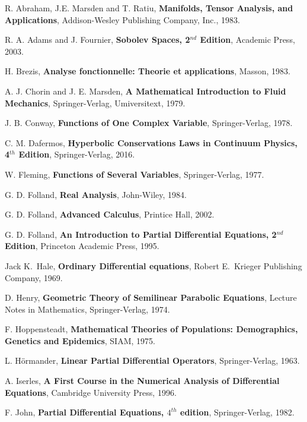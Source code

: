 \begin{thebibliography}{99}

 R. Abraham, J.E. Marsden and T. Ratiu,
{\bfseries Manifolds, Tensor Analysis, and Applications},
Addison-Wesley Publishing Company, Inc., 1983.

 R. A. Adams and J. Fournier,
{\bfseries Sobolev Spaces, 2$^{nd}$ Edition}, Academic Press, 2003.

 H. Brezis,
{\bfseries Analyse fonctionnelle: Theorie et applications}, Masson, 1983.

 A. J. Chorin and J. E. Marsden,
{\bfseries A Mathematical Introduction to Fluid Mechanics},
Springer-Verlag, Umiversitext, 1979.

 J. B. Conway,
{\bfseries Functions of One Complex Variable}, Springer-Verlag, 1978.

 C. M. Dafermos, {\bfseries Hyperbolic Conservations Laws
in Continuum Physics, 4$^{th}$ Edition}, Springer-Verlag, 2016.

 W. Fleming, {\bfseries Functions of Several Variables},
Springer-Verlag, 1977.

 G. D. Folland, {\bfseries Real Analysis}, John-Wiley,
1984.

 G. D. Folland, {\bfseries Advanced Calculus}, Printice
Hall, 2002.

 G. D. Folland,
{\bfseries An Introduction to Partial Differential Equations, 2$^{nd}$ Edition},
Princeton Academic Press, 1995.

 Jack K.\ Hale, {\bfseries Ordinary Differential equations},
Robert E.\ Krieger Publishing Company, 1969.

 D. Henry,
{\bfseries Geometric Theory of Semilinear Parabolic Equations},
Lecture Notes in Mathematics, Springer-Verlag, 1974.

 F. Hoppensteadt,
{\bfseries Mathematical Theories of Populations: Demographics,
Genetics and Epidemics}, SIAM, 1975.

 L. Hörmander,
{\bfseries Linear Partial Differential Operators}, Springer-Verlag, 1963.

 A. Iserles,
{\bfseries A First Course in the Numerical Analysis of Differential
Equations}, Cambridge University Press, 1996.

 F. John,
{\bfseries Partial Differential Equations, $4^{th}$ edition},
Springer-Verlag, 1982.


\end{thebibliography}
